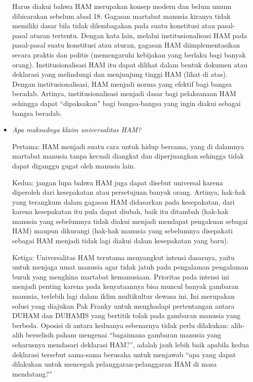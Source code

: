 \documentclass[11pt,twoside,a5paper,openany]{memoir}
\begin{document}
\begin{itemize}
  Harus diakui bahwa HAM merupakan konsep modern dan belum umum
  dibicarakan sebelum abad 18. Gagasan martabat manusia kiranya tidak
  memiliki dasar bila tidak dilembagakan pada suatu konstitusi atau
  pasal-pasal aturan tertentu. Dengan kata lain, melalui
  institusionalisasi HAM pada pasal-pasal suatu konstitusi atau aturan,
  gagasan HAM diimplementasikan secara praktis dan politis (memengaruhi
  kebijakan yang berlaku bagi banyak orang). Institusionalisasi HAM itu
  dapat dilihat dalam bentuk dokumen atau deklarasi yang melindungi dan
  menjunjung tinggi HAM (lihat di atas). Dengan institusionalisasi, HAM
  menjadi norma yang efektif bagi bangsa beradab. Artinya,
  institusionalisasi menjadi dasar bagi pelaksanaan HAM sehingga dapat
  ``dipaksakan'' bagi bangsa-bangsa yang ingin diakui sebagai bangsa
  beradab.
\item
  \emph{Apa maksudnya klaim universalitas HAM?}

  Pertama: HAM menjadi suatu cara untuk hidup bersama, yang di dalamnya
  martabat manusia tanpa kecuali diangkat dan diperjuangkan sehingga
  tidak dapat diganggu gugat oleh manusia lain.

  Kedua: jangan lupa bahwa HAM juga dapat disebut universal karena
  diperoleh dari kesepakatan atau persetujuan banyak orang. Artinya,
  hak-hak yang terangkum dalam gagasan HAM didasarkan pada kesepakatan,
  dari karena kesepakatan itu pula dapat diubah, baik itu ditambah
  (hak-hak manusia yang sebelumnya tidak diakui menjadi mendapat
  pengakuan sebagai HAM) maupun dikurangi (hak-hak manusia yang
  sebelumnya disepakati sebagai HAM menjadi tidak lagi diakui dalam
  kesepakatan yang baru).

  Ketiga: Universalitas HAM terutama menyangkut intensi dasarnya, yaitu
  untuk menjaga umat manusia agar tidak jatuh pada pengalaman pengalaman
  buruk yang menghina martabat kemanusiaan. Prioritas pada intensi ini
  menjadi penting karena pada kenyataannya bisa muncul banyak gambaran
  manusia, terlebih lagi dalam iklim multikultur dewasa ini. Ini
  merupakan solusi yang diajukan Pak Franky untuk menghadapi
  pertentangan antara DUHAM dan DUHAMIS yang bertitik tolak pada
  gambaran manusia yang berbeda. Oposisi di antara keduanya sebenarnya
  tidak perlu dilakukan: alih-alih berselisih paham mengenai ``bagaimana
  gambaran manusia yang seharusnya mendasari deklarasi HAM?'', adalah
  jauh lebih baik apabila kedua deklarasi tersebut sama-sama berusaha
  untuk menjawab ``apa yang dapat dilakukan untuk mencegah
  pelanggaran-pelanggaran HAM di masa mendatang?''
\end{itemize}
\end{document}
